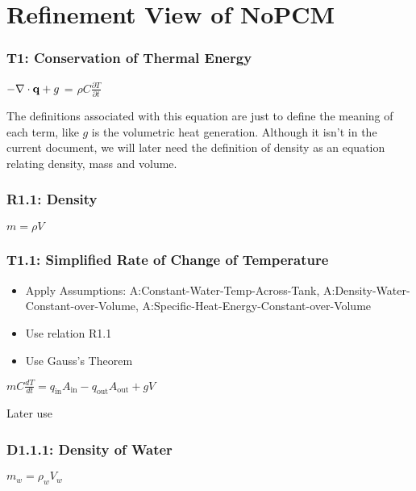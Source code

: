 \documentclass[12pt]{article}
\begin{document}
\section*{Refinement View of NoPCM}

\subsubsection*{T1: Conservation of Thermal Energy}

\noindent $-{\bf \nabla \cdot q} + g$ = $\rho C \frac{\partial T}{\partial t}$

The definitions associated with this equation are just to define the meaning of
each term, like $g$ is the volumetric heat generation.  Although it isn't in the
current document, we will later need the definition of density as an equation
relating density, mass and volume.

\subsubsection*{R1.1: Density}

\noindent $m = \rho V$

\subsubsection*{T1.1: Simplified Rate of Change of Temperature}

\begin{itemize}
\item Apply Assumptions: A:Constant-Water-Temp-Across-Tank,
A:Density-Water-Constant-over-Volume,
A:Specific-Heat-Energy-Constant-over-Volume
\item Use relation R1.1
\item Use Gauss's Theorem
\end{itemize}

\noindent $m C \frac{dT}{dt} = q_{\mathrm{in}} A_{\mathrm{in}} - 
q_{\mathrm{out}} A_{\mathrm{out}} + g V$

Later use

\subsubsection*{D1.1.1: Density of Water}

\noindent $m_w = \rho_w V_w$
\end{document}
